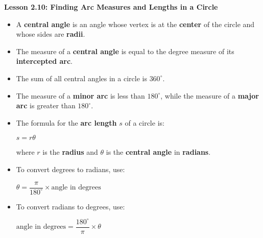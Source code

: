 \begin{center}
\textbf{Lesson 2.10: Finding Arc Measures and Lengths in a Circle}
\end{center}

\vspace*{-1.5ex}


\begin{itemize}
    \item A \textbf{central angle} is an angle whose vertex is at the \textbf{center} of the circle and whose sides are \textbf{radii}.
    \item The measure of a \textbf{central angle} is equal to the degree measure of its \textbf{intercepted arc}.
    \item The sum of all central angles in a circle is $360^\circ$.
    \item The measure of a \textbf{minor arc} is less than $180^\circ$, while the measure of a \textbf{major arc} is greater than $180^\circ$.
    \item The formula for the \textbf{arc length} $s$ of a circle is:
      
{\centering $ 
    s = r\theta
$\par}
    where $r$ is the \textbf{radius} and $\theta$ is the \textbf{central angle} in \textbf{radians}.
  \item To convert degrees to radians, use:
    
{\centering $
    \theta = \dfrac{\pi}{180^\circ} \times \text{angle in degrees}
$\par}
\item To convert radians to degrees, use:
  
{\centering $ 
    \text{angle in degrees} = \dfrac{180^\circ}{\pi} \times \theta
$\par}
\end{itemize}

